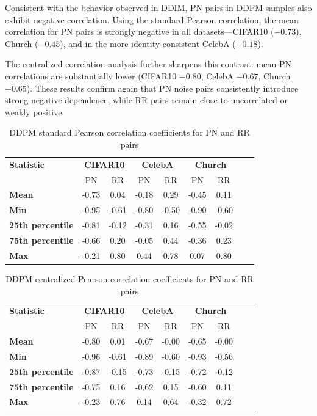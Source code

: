\documentclass[12pt]{article}
\newcommand{\0}{\mathbf{0}}
\begin{document}
Consistent with the behavior observed in DDIM, PN pairs in DDPM samples also exhibit negative correlation. Using the standard Pearson correlation, the mean correlation for PN pairs is strongly negative in all datasets—CIFAR10 ($-0.73$), Church ($-0.45$), and in the more identity-consistent CelebA ($-0.18$). 

The centralized correlation analysis further sharpens this contrast: mean PN correlations are substantially lower (CIFAR10 $-0.80$, CelebA $-0.67$, Church $-0.65$). These results confirm again that PN noise pairs consistently introduce strong negative dependence, while RR pairs remain close to uncorrelated or weakly positive.

\begin{table}[ht]
\centering
\caption{DDPM standard Pearson correlation coefficients for PN and RR pairs}
\label{tab:DDPM_noise_stats_standard}
\begin{tabular}{lcccccccc}
\toprule
\textbf{Statistic} & \multicolumn{2}{c}{\textbf{CIFAR10}} & \multicolumn{2}{c}{\textbf{CelebA}} & \multicolumn{2}{c}{\textbf{Church}}\\
 & PN & RR & PN & RR & PN & RR\\
\midrule
\textbf{Mean}              & -0.73 & 0.04 & -0.18 & 0.29 & -0.45 & 0.11 \\
\hline
\textbf{Min}               & -0.95 & -0.61 & -0.80 & -0.50 & -0.90 & -0.60 \\
\textbf{25th percentile}   & -0.81 & -0.12 & -0.31 & 0.16 & -0.55 & -0.02 \\
\textbf{75th percentile}   & -0.66 & 0.20 & -0.05 & 0.44 & -0.36 & 0.23 \\
\textbf{Max}               & -0.21 & 0.80 & 0.44 & 0.78 & 0.07 & 0.80 \\
\bottomrule
\end{tabular}
\end{table}

\begin{table}[ht]
\centering
\caption{DDPM centralized Pearson correlation coefficients for PN and RR pairs}
\label{tab:DDPM_noise_stats_cent}
\begin{tabular}{lcccccccc}
\toprule
\textbf{Statistic} & \multicolumn{2}{c}{\textbf{CIFAR10}} & \multicolumn{2}{c}{\textbf{CelebA}} & \multicolumn{2}{c}{\textbf{Church}}\\
 & PN & RR & PN & RR & PN & RR\\
\midrule
\textbf{Mean}              & -0.80 & 0.01 & -0.67 & -0.00 & -0.65 & -0.00 \\
\hline
\textbf{Min}               & -0.96 & -0.61 & -0.89 & -0.60 & -0.93 & -0.56 \\
\textbf{25th percentile}   & -0.87 & -0.15 & -0.73 & -0.15 & -0.72 & -0.12 \\
\textbf{75th percentile}   & -0.75 &  0.16 & -0.62 &  0.15 & -0.60 &  0.11 \\
\textbf{Max}               & -0.23 &  0.76 &  0.14 &  0.64 & -0.32 &  0.72 \\
\bottomrule
\end{tabular}
\end{table}
\end{document}
